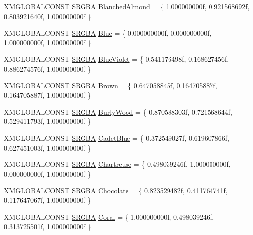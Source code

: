 \begin{DoxyCompactItemize}
\item 
X\+M\+G\+L\+O\+B\+A\+L\+C\+O\+N\+ST \hyperlink{structmage_1_1_s_r_g_b_a}{S\+R\+G\+BA} \hyperlink{namespacemage_1_1color_a2163d78d006491bb060f32315daf195d}{Blanched\+Almond} = \{ 1.\+000000000f, 0.\+921568692f, 0.\+803921640f, 1.\+000000000f \}
\item 
X\+M\+G\+L\+O\+B\+A\+L\+C\+O\+N\+ST \hyperlink{structmage_1_1_s_r_g_b_a}{S\+R\+G\+BA} \hyperlink{namespacemage_1_1color_a699234cc5b5cf8bb6016f53e97f7b930}{Blue} = \{ 0.\+000000000f, 0.\+000000000f, 1.\+000000000f, 1.\+000000000f \}
\item 
X\+M\+G\+L\+O\+B\+A\+L\+C\+O\+N\+ST \hyperlink{structmage_1_1_s_r_g_b_a}{S\+R\+G\+BA} \hyperlink{namespacemage_1_1color_adade1710d2f06635049027dd4ea95fa3}{Blue\+Violet} = \{ 0.\+541176498f, 0.\+168627456f, 0.\+886274576f, 1.\+000000000f \}
\item 
X\+M\+G\+L\+O\+B\+A\+L\+C\+O\+N\+ST \hyperlink{structmage_1_1_s_r_g_b_a}{S\+R\+G\+BA} \hyperlink{namespacemage_1_1color_a5e4deb01ea5fe6d419507d0a934b2c2e}{Brown} = \{ 0.\+647058845f, 0.\+164705887f, 0.\+164705887f, 1.\+000000000f \}
\item 
X\+M\+G\+L\+O\+B\+A\+L\+C\+O\+N\+ST \hyperlink{structmage_1_1_s_r_g_b_a}{S\+R\+G\+BA} \hyperlink{namespacemage_1_1color_af7eaff8744af0f0e21ff49edea44c0d4}{Burly\+Wood} = \{ 0.\+870588303f, 0.\+721568644f, 0.\+529411793f, 1.\+000000000f \}
\item 
X\+M\+G\+L\+O\+B\+A\+L\+C\+O\+N\+ST \hyperlink{structmage_1_1_s_r_g_b_a}{S\+R\+G\+BA} \hyperlink{namespacemage_1_1color_a8f65ce7d8851e033982b2b8266547c6d}{Cadet\+Blue} = \{ 0.\+372549027f, 0.\+619607866f, 0.\+627451003f, 1.\+000000000f \}
\item 
X\+M\+G\+L\+O\+B\+A\+L\+C\+O\+N\+ST \hyperlink{structmage_1_1_s_r_g_b_a}{S\+R\+G\+BA} \hyperlink{namespacemage_1_1color_aa07af7621f6070d32d7846379e1a1ef3}{Chartreuse} = \{ 0.\+498039246f, 1.\+000000000f, 0.\+000000000f, 1.\+000000000f \}
\item 
X\+M\+G\+L\+O\+B\+A\+L\+C\+O\+N\+ST \hyperlink{structmage_1_1_s_r_g_b_a}{S\+R\+G\+BA} \hyperlink{namespacemage_1_1color_addc2d90f52c38f52da61f5f4e0cd2f8f}{Chocolate} = \{ 0.\+823529482f, 0.\+411764741f, 0.\+117647067f, 1.\+000000000f \}
\item 
X\+M\+G\+L\+O\+B\+A\+L\+C\+O\+N\+ST \hyperlink{structmage_1_1_s_r_g_b_a}{S\+R\+G\+BA} \hyperlink{namespacemage_1_1color_a50e83d997f1f5f1deca879c40eea1b4e}{Coral} = \{ 1.\+000000000f, 0.\+498039246f, 0.\+313725501f, 1.\+000000000f \}
\item 

\end{DoxyCompactItemize}
